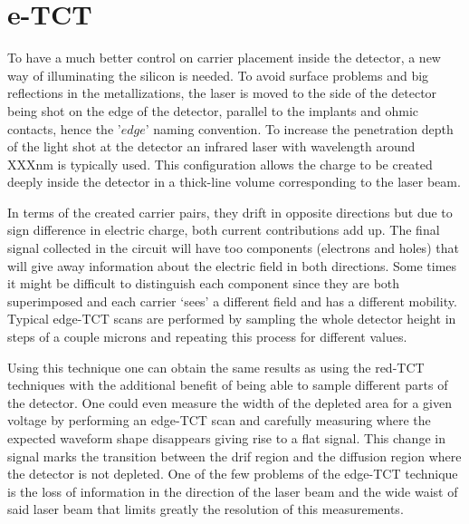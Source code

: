 
\section{e-TCT} %

To have a much better control on carrier placement inside the detector, a new way of illuminating the silicon is needed. To avoid surface problems and big reflections in the metallizations, the laser is moved to the side of the detector being shot on the edge of the detector, parallel to the implants and ohmic contacts, hence the '$edge$' naming convention. To increase the penetration depth of the light shot at the detector an infrared laser with wavelength around XXXnm is typically used. This configuration allows the charge to be created deeply inside the detector in a thick-line volume corresponding to the laser beam.

In terms of the created carrier pairs, they drift in opposite directions but due to sign difference in electric charge, both current contributions add up. The final signal collected in the circuit will have too components (electrons and holes) that will give away information about the electric field in both directions. Some times it might be difficult to distinguish each component since they are both superimposed and each carrier `sees' a different field and has a different mobility. Typical edge-TCT scans are performed by sampling the whole detector height in steps of a couple microns and repeating this process for different \vias values.

Using this technique one can obtain the same results as using the red-TCT techniques with the additional benefit of being able to sample different parts of the detector. One could even measure the width of the depleted area for a given voltage by performing an edge-TCT scan and carefully measuring where the expected waveform shape disappears giving rise to a flat signal. This change in signal marks the transition between the drif region and the diffusion region where the detector is not depleted. One of the few problems of the edge-TCT technique is the loss of information in the direction of the laser beam and the wide waist of said laser beam that limits greatly the resolution of this measurements.

